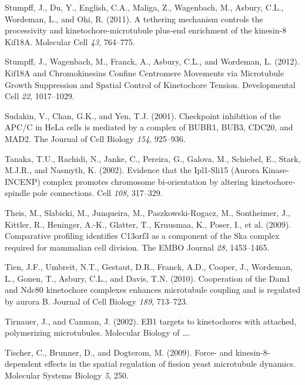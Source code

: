 \documentclass[12pt,a4paper,twoside,openright]{book}
\begin{document}
Stumpff, J., Du, Y., English, C.A., Maliga, Z., Wagenbach, M., Asbury,
C.L., Wordeman, L., and Ohi, R. (2011). A tethering mechanism controls
the processivity and kinetochore-microtubule plus-end enrichment of the
kinesin-8 Kif18A. Molecular Cell \emph{43}, 764--775.

Stumpff, J., Wagenbach, M., Franck, A., Asbury, C.L., and Wordeman, L.
(2012). Kif18A and Chromokinesins Confine Centromere Movements via
Microtubule Growth Suppression and Spatial Control of Kinetochore
Tension. Developmental Cell \emph{22}, 1017--1029.

Sudakin, V., Chan, G.K., and Yen, T.J. (2001). Checkpoint inhibition of
the APC/C in HeLa cells is mediated by a complex of BUBR1, BUB3, CDC20,
and MAD2. The Journal of Cell Biology \emph{154}, 925--936.

Tanaka, T.U., Rachidi, N., Janke, C., Pereira, G., Galova, M., Schiebel,
E., Stark, M.J.R., and Nasmyth, K. (2002). Evidence that the Ipl1-Sli15
(Aurora Kinase-INCENP) complex promotes chromosome bi-orientation by
altering kinetochore-spindle pole connections. Cell \emph{108},
317--329.

Theis, M., Slabicki, M., Junqueira, M., Paszkowski-Rogacz, M.,
Sontheimer, J., Kittler, R., Heninger, A.-K., Glatter, T., Kruusmaa, K.,
Poser, I., et al. (2009). Comparative profiling identifies C13orf3 as a
component of the Ska complex required for mammalian cell division. The
EMBO Journal \emph{28}, 1453--1465.

Tien, J.F., Umbreit, N.T., Gestaut, D.R., Franck, A.D., Cooper, J.,
Wordeman, L., Gonen, T., Asbury, C.L., and Davis, T.N. (2010).
Cooperation of the Dam1 and Ndc80 kinetochore complexes enhances
microtubule coupling and is regulated by aurora B. Journal of Cell
Biology \emph{189}, 713--723.

Tirnauer, J., and Canman, J. (2002). EB1 targets to kinetochores with
attached, polymerizing microtubules. Molecular Biology of \ldots{}.

Tischer, C., Brunner, D., and Dogterom, M. (2009). Force- and
kinesin-8-dependent effects in the spatial regulation of fission yeast
microtubule dynamics. Molecular Systems Biology \emph{5}, 250.
\end{document}
